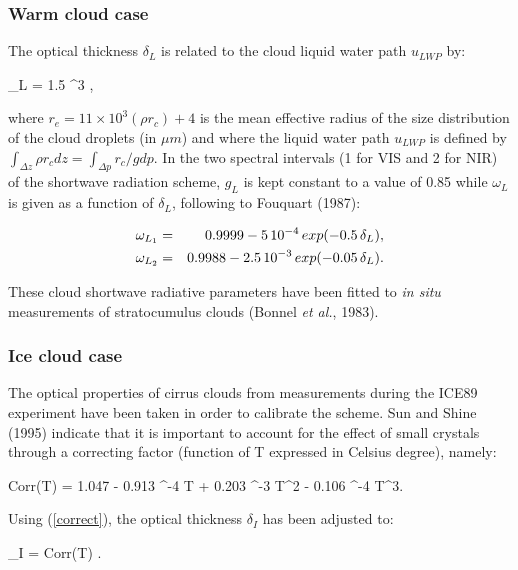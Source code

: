 %
\subsubsection{Warm cloud case}
%

The optical thickness $\delta_{L}$ is related to the cloud liquid water path
$u_{LWP}$ by:

\medskip
\be
\delta_{L} = 1.5 ^3 ,
\label{ecmwf334}
\ee
\medskip

\noindent where $r_e=11 \times 10^3(\rho r_c)+4$ is the mean effective radius of
the size distribution of the cloud droplets (in $\mu m$) and where the liquid
water path $u_{LWP}$ is defined by
$\int_{\Delta z} \rho r_c dz=\int_{\Delta p} r_c/g dp$. In the two spectral
intervals (1 for VIS and 2 for NIR) of the shortwave radiation scheme, $g_L$ is
kept constant to a value of 0.85 while $\omega_L$ is given as a function of
$\delta_L$, following to Fouquart (1987):

\medskip
\begin{eqnarray}\label{ecmwf335}
\omega_{L_1} &=& 0.9999 - 5 \, 10^{-4} \, exp(-0.5 \, \delta_L), \cr
\omega_{L_2} &=& 0.9988 - 2.5 \, 10^{-3} \, exp(-0.05 \, \delta_L).
\end{eqnarray}
\medskip

\noindent These cloud shortwave radiative parameters have been fitted to
{\em in situ} measurements of stratocumulus clouds
(Bonnel {\em et al.}, 1983).\\

%
\subsubsection{Ice cloud case}
%

The optical properties of cirrus clouds from measurements during the ICE89
experiment have been taken in order to calibrate the scheme. Sun and Shine
(1995) indicate that it is important to account for the effect of small crystals
through a correcting factor (function of T expressed in Celsius degree), namely:

\medskip
\be\label{correct}
Corr(T) = 1.047 - 0.913 ^{-4} T + 0.203 ^{-3} T^2 - 0.106 ^{-4} T^3.
\ee
\medskip

Using (\ref{correct}), the optical thickness $\delta_I$ has been adjusted to:

\medskip
\be
\delta_I = Corr(T) .
\ee
\medskip

